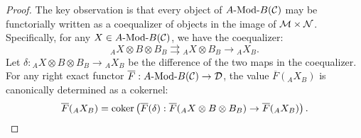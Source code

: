 \documentclass{amsart}
\begin{document}
\begin{proof}
The key observation is that every object of $\Mod{A}{B}(\cC)$ may be functorially written as a coequalizer of objects in the image of $\mathcal M \times \mathcal N$. Specifically, for any $X \in \Mod{A}{B}(\cC)$, we have the coequalizer:
\begin{equation*}
	{}_A X \otimes B \otimes B_B \rightrightarrows {}_A X \otimes B_B \to {}_A X_B.
\end{equation*}
Let %
$\delta: {}_A X \otimes B \otimes B_B \to {}_A X_B$ 
be the difference of the two maps in the coequalizer. 
For any right exact functor $\overline{F}: \Mod{A}{B}(\cC) \to \cD$, the value $\overline{F}({}_A X_B)$ is canonically determined as a cokernel:
\begin{equation*}
	\overline{F}({}_A X_B) = \operatorname*{coker} \left( \overline{F}(\delta): \overline{F}( {}_A X \otimes B \otimes B_B) \to \overline{F}({}_A X_B) \right).
\end{equation*} 
	

\end{proof}
\end{document}
